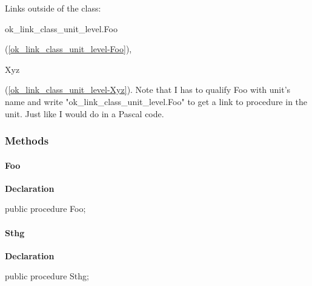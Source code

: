 \documentclass{report}
\begin{document}
Links outside of the class: \begin{ttfamily}ok{\_}link{\_}class{\_}unit{\_}level.Foo\end{ttfamily}(\ref{ok_link_class_unit_level-Foo}), \begin{ttfamily}Xyz\end{ttfamily}(\ref{ok_link_class_unit_level-Xyz}). Note that I has to qualify Foo with unit's name and write "ok{\_}link{\_}class{\_}unit{\_}level.Foo" to get a link to procedure in the unit. Just like I would do in a Pascal code.\subsubsection*{\large{\textbf{Methods}}\normalsize\hspace{1ex}\hfill}
\paragraph*{Foo}\hspace*{\fill}

\begin{list}{}{
\setlength{\itemindent}{0cm}
\setlength{\listparindent}{0cm}
\setlength{\leftmargin}{\evensidemargin}
\addtolength{\leftmargin}{\tmplength}
\settowidth{\labelsep}{X}
\addtolength{\leftmargin}{\labelsep}
\setlength{\labelwidth}{\tmplength}
}
\begin{flushleft}
\item[\textbf{Declaration}\hfill]
\begin{ttfamily}
public procedure Foo;\end{ttfamily}


\end{flushleft}
\end{list}
\paragraph*{Sthg}\hspace*{\fill}

\begin{list}{}{
\setlength{\itemindent}{0cm}
\setlength{\listparindent}{0cm}
\setlength{\leftmargin}{\evensidemargin}
\addtolength{\leftmargin}{\tmplength}
\settowidth{\labelsep}{X}
\addtolength{\leftmargin}{\labelsep}
\setlength{\labelwidth}{\tmplength}
}
\begin{flushleft}
\item[\textbf{Declaration}\hfill]
\begin{ttfamily}
public procedure Sthg;\end{ttfamily}


\end{flushleft}
\end{list}
\end{document}
